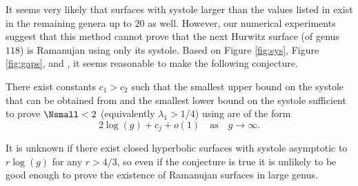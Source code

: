 \documentclass[12pt]{amsart}
\numberwithin{equation}{section}
\begin{document}
It seems very likely that surfaces with systole larger than the values listed in  exist in the remaining genera up to $20$ as well. However, our numerical experiments suggest that this method cannot prove that the next Hurwitz surface (of genus $118$) is Ramanujan using only its systole. Based on Figure \ref{fig:sys}, Figure \ref{fig:gaps}, and , it seems reasonable to make the following conjecture.

\begin{conj}
There exist constants $c_1 > c_2$ such that the smallest upper bound on the systole that can be obtained from   and the smallest lower bound on the systole sufficient to prove $\Nsmall < 2$ (equivalently $\lambda_1 > 1/4$) using  are of the form
\[
2 \log(g) + c_j + o(1)  \quad \text{as} \quad g \to \infty.
\]
\end{conj}

It is unknown if there exist closed hyperbolic surfaces with systole asymptotic to $r \log(g)$ for any $r> 4/3$, so even if the conjecture is true it is unlikely to be good enough to prove the existence of Ramanujan surfaces in large genus.




\end{document}
